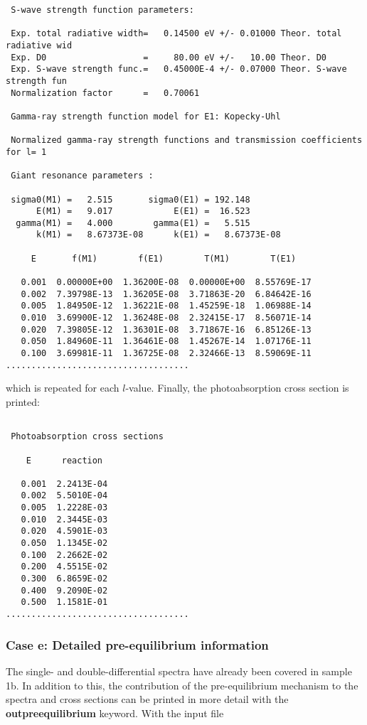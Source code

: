 \begin{samplecase}
{\begin{verbatim}
 S-wave strength function parameters:
   
 Exp. total radiative width=   0.14500 eV +/- 0.01000 Theor. total radiative wid
 Exp. D0                   =     80.00 eV +/-   10.00 Theor. D0                 
 Exp. S-wave strength func.=   0.45000E-4 +/- 0.07000 Theor. S-wave strength fun
 Normalization factor      =   0.70061
   
 Gamma-ray strength function model for E1: Kopecky-Uhl
   
 Normalized gamma-ray strength functions and transmission coefficients for l= 1

 Giant resonance parameters :
   
 sigma0(M1) =   2.515       sigma0(E1) = 192.148
      E(M1) =   9.017            E(E1) =  16.523
  gamma(M1) =   4.000        gamma(E1) =   5.515
      k(M1) =   8.67373E-08      k(E1) =   8.67373E-08
   
     E       f(M1)        f(E1)        T(M1)        T(E1)
   
   0.001  0.00000E+00  1.36200E-08  0.00000E+00  8.55769E-17
   0.002  7.39798E-13  1.36205E-08  3.71863E-20  6.84642E-16
   0.005  1.84950E-12  1.36221E-08  1.45259E-18  1.06988E-14
   0.010  3.69900E-12  1.36248E-08  2.32415E-17  8.56071E-14
   0.020  7.39805E-12  1.36301E-08  3.71867E-16  6.85126E-13
   0.050  1.84960E-11  1.36461E-08  1.45267E-14  1.07176E-11
   0.100  3.69981E-11  1.36725E-08  2.32466E-13  8.59069E-11
....................................
\end{verbatim} } \renewcommand{\baselinestretch}{1.07}\small\normalsize
\noindent
which is repeated for each $l$-value. Finally, the photoabsorption
cross section is printed:

{\small \begin{verbatim}

 Photoabsorption cross sections
 
    E      reaction
 
   0.001  2.2413E-04
   0.002  5.5010E-04
   0.005  1.2228E-03
   0.010  2.3445E-03
   0.020  4.5901E-03      
   0.050  1.1345E-02
   0.100  2.2662E-02
   0.200  4.5515E-02
   0.300  6.8659E-02
   0.400  9.2090E-02
   0.500  1.1581E-01
....................................
\end{verbatim} } \renewcommand{\baselinestretch}{1.07}\small\normalsize
\subsubsection{Case e: Detailed pre-equilibrium information}
The single- and double-differential spectra have already been covered in 
sample 1b. In addition to this, the contribution of the pre-equilibrium 
mechanism to the spectra 
and cross sections can be printed in more detail with the 
{\bf outpreequilibrium} keyword.
With the input file


\end{samplecase}
